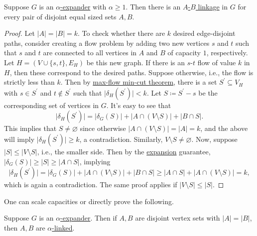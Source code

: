 \begin{lemma}\label{lma:expander-linkage}
	Suppose \(G\) is an \hyperref[def:expander]{\(\alpha \)-expander} with \(\alpha \geq 1\). Then there is an \hyperref[def:linkage]{\(A\)-\(B\) linkage} in \(G\) for every pair of disjoint equal sized sets \(A, B\).
\end{lemma}
\begin{proof}
	Let \(\lvert A \rvert = \lvert B \rvert = k\). To check whether there are \(k\) desired edge-disjoint paths, consider creating a flow problem by adding two new vertices \(s\) and \(t\) such that \(s\) and \(t\) are connected to all vertices in \(A\) and \(B\) of capacity \(1\), respectively. Let \(H = (V \cup \{ s, t \} , E_H)\) be this new graph. If there is an \(s\)-\(t\) flow of value \(k\) in \(H\), then these correspond to the desired paths. Suppose otherwise, i.e., the flow is strictly less than \(k\). Then by \hyperref[thm:max-flow-min-cut]{max-flow min-cut theorem}, there is a set \(S^{\prime} \subseteq V_H\) with \(s \in S^{\prime} \) and \(t \notin S^{\prime} \) such that \(\lvert \delta _H(S^{\prime} ) \rvert < k\). Let \(S \coloneqq S^{\prime}  - s\) be the corresponding set of vertices in \(G\). It's easy to see that
	\[
		\lvert \delta _H(S^{\prime} ) \rvert
		= \lvert \delta _G(S) \rvert + \lvert A \cap (V\setminus S) \rvert + \lvert B \cap S \rvert.
	\]
	This implies that \(S \neq \varnothing \) since otherwise \(\lvert A \cap (V\setminus S) \rvert = \lvert A \rvert = k\), and the above will imply \(\lvert \delta _H(S^{\prime} ) \rvert \geq k\), a contradiction. Similarly, \(V\setminus S \neq \varnothing \). Now, suppose \(\lvert S \rvert \leq \lvert V\setminus S \rvert \), i.e., the smaller side. Then by the \hyperref[def:expansion]{expansion} guarantee, \(\lvert \delta _G(S) \rvert \geq \lvert S \rvert \geq \lvert A \cap S \rvert \), implying
	\[
		\lvert \delta _H(S^{\prime} ) \rvert
		= \lvert \delta _G(S) \rvert + \lvert A \cap (V\setminus S) \rvert + \lvert B \cap S \rvert
		\geq \lvert A \cap S \rvert + \lvert A \cap (V\setminus S) \rvert
		= k,
	\]
	which is again a contradiction. The same proof applies if \(\lvert V \setminus S \rvert \leq \lvert S \rvert \).
\end{proof}

One can scale capacities or directly prove the following.

\begin{corollary}
	Suppose \(G\) is an \hyperref[def:expander]{\(\alpha \)-expander}. Then if \(A, B\) are disjoint vertex sets with \(\lvert A \rvert = \lvert B \rvert \), then \(A, B\) are \hyperref[def:fractional-linkage]{\(\alpha \)-linked}.
\end{corollary}

